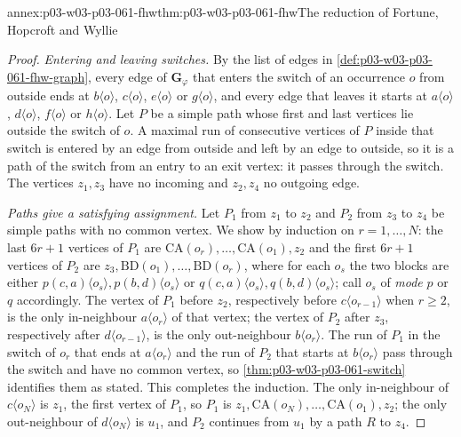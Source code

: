 \begin{annexitem}{annex:p03-w03-p03-061-fhw}{thm:p03-w03-p03-061-fhw}{The reduction of Fortune, Hopcroft and Wyllie}
\begin{proof}
\emph{Entering and leaving switches.} By the list of edges in
\cref{def:p03-w03-p03-061-fhw-graph}, every edge of \(\mathbf G_\varphi\) that
enters the switch of an occurrence \(o\) from outside ends at
\(b\langle o\rangle\), \(c\langle o\rangle\), \(e\langle o\rangle\) or
\(g\langle o\rangle\), and every edge that leaves it starts at
\(a\langle o\rangle\), \(d\langle o\rangle\), \(f\langle o\rangle\) or
\(h\langle o\rangle\). Let \(P\) be a simple path whose first and last
vertices lie outside the switch of \(o\). A maximal run of consecutive
vertices of \(P\) inside that switch is entered by an edge from outside and
left by an edge to outside, so it is a path of the switch from an entry to an
exit vertex: it passes through the switch. The vertices \(z_1,z_3\) have no
incoming and \(z_2,z_4\) no outgoing edge.

\emph{Paths give a satisfying assignment.} Let \(P_1\) from \(z_1\) to
\(z_2\) and \(P_2\) from \(z_3\) to \(z_4\) be simple paths with no common
vertex. We show by induction on \(r=1,\ldots,N\): the last
\(6r+1\) vertices of \(P_1\) are \(\mathrm{CA}(o_r),\ldots,\mathrm{CA}(o_1),z_2\)
and the first \(6r+1\) vertices of \(P_2\) are
\(z_3,\mathrm{BD}(o_1),\ldots,\mathrm{BD}(o_r)\), where for each \(o_s\) the
two blocks are either \(p(c,a)\langle o_s\rangle,p(b,d)\langle o_s\rangle\)
or \(q(c,a)\langle o_s\rangle,q(b,d)\langle o_s\rangle\); call \(o_s\) of
\emph{mode} \(p\) or \(q\) accordingly. The vertex of \(P_1\) before
\(z_2\), respectively before \(c\langle o_{r-1}\rangle\) when \(r\ge2\), is the
only in-neighbour \(a\langle o_r\rangle\) of that vertex; the vertex of \(P_2\)
after \(z_3\), respectively after \(d\langle o_{r-1}\rangle\), is the only
out-neighbour \(b\langle o_r\rangle\). The run of \(P_1\) in the switch of
\(o_r\) that ends at \(a\langle o_r\rangle\) and the run of \(P_2\) that starts
at \(b\langle o_r\rangle\) pass through the switch and have no common vertex,
so \cref{thm:p03-w03-p03-061-switch} identifies them as stated. This
completes the induction. The only in-neighbour of \(c\langle o_N\rangle\) is
\(z_1\), the first vertex of \(P_1\), so \(P_1\) is \(z_1,\mathrm{CA}(o_N),
\ldots,\mathrm{CA}(o_1),z_2\); the only out-neighbour of \(d\langle o_N\rangle\)
is \(u_1\), and \(P_2\) continues from \(u_1\) by a path \(R\) to \(z_4\).


\end{proof}
\end{annexitem}
